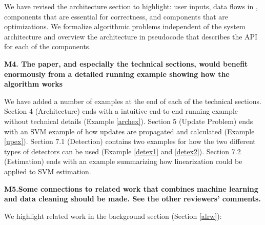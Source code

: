 We have revised the architecture section to highlight: user inputs, data flows in \sys, components that are essential for correctness, and components that are optimizations.
We formalize algorithmic problems independent of the system architecture and overview the architecture in pseudocode that describes the API for each of the components.

\vspace{0.5em}

\noindent\textbf{M4. The paper, and especially the technical sections, would benefit enormously from a detailed running example showing how the algorithm works}

We have added a number of examples at the end of each of the technical sections. Section 4 (Architecture) ends with a intuitive end-to-end running example without technical details (Example \ref{archex}).
Section 5 (Update Problem) ends with an SVM example of how updates are propagated and calculated (Example \ref{upex}).
Section 7.1 (Detection) contains two examples for how the two different types of detectors can be used (Example \ref{detex1} and \ref{detex2}).
Section 7.2 (Estimation) ends with an example summarizing how linearization could be applied to SVM estimation.

\vspace{0.5em}

\noindent\textbf{M5.Some connections to related work that combines machine learning and data cleaning should be made. See the other reviewers' comments.}

We highlight related work in the background section (Section \ref{alrw}):

